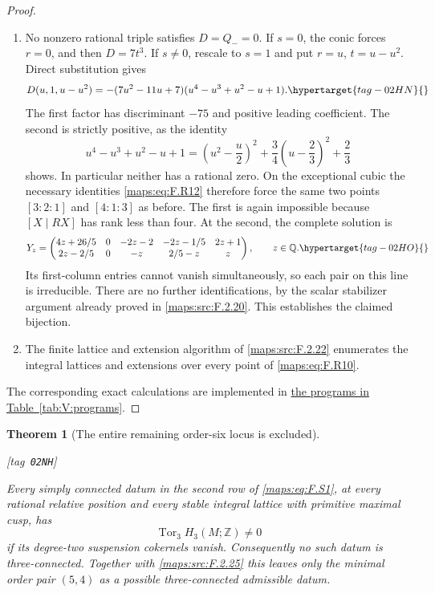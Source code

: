 \documentclass[11pt,a4paper]{article}
\numberwithin{equation}{section}
\newtheorem{theorem}{Theorem}[section]
\theoremstyle{definition}
\newcommand{\StatementRecord}[4]{{\upshape\footnotesize[tag~\texttt{#3}]}\enspace\ignorespaces}
\begin{document}
\begin{proof}
\begin{enumerate}[label=\arabic*.]
\item No nonzero rational triple satisfies $D=Q_-=0$.
If $s=0$, the conic forces $r=0$, and then $D=7t^3$.
If $s\ne0$, rescale to $s=1$ and put
$r=u$, $t=u-u^2$.  Direct substitution gives
\begin{equation}
 D(u,1,u-u^2)=
 -(7u^2-11u+7)(u^4-u^3+u^2-u+1).
 \hypertarget{tag-02HN}{}\label{maps:eq:F.R13}
\end{equation}
The first factor has discriminant $-75$ and positive
leading coefficient.  The second is strictly positive,
as the identity
\[
 u^4-u^3+u^2-u+1
 =\left(u^2-\frac u2\right)^2
  +\frac34\left(u-\frac23\right)^2+\frac23
\]
shows.  In particular neither has a rational zero.
On the exceptional cubic the necessary identities \eqref{maps:eq:F.R12}
therefore force the same two points $[3:2:1]$ and $[4:1:3]$
as before.  The first is again impossible because
$[X\mid RX]$ has rank less than four.
At the second, the complete solution is
\begin{equation}
 Y_z=\begin{pmatrix}
 4z+26/5&0&-2z-2&-2z-1/5&2z+1\\
 2z-2/5&0&-z&2/5-z&z
 \end{pmatrix},\qquad z\in\mathbb Q.
 \hypertarget{tag-02HO}{}\label{maps:eq:F.R14}
\end{equation}
Its first-column entries cannot vanish simultaneously,
so each pair on this line is irreducible.
There are no further identifications, by the scalar
stabilizer argument already proved in \ref{maps:src:F.2.20}.
This establishes the claimed bijection.

\item The finite lattice and extension algorithm of \ref{maps:src:F.2.22}
enumerates the integral lattices and extensions over every point of
\eqref{maps:eq:F.R10}.

\end{enumerate}
The corresponding exact calculations are implemented in \hyperlink{prog:V:normal-forms}{the programs in Table~\ref*{tab:V:programs}}.
\end{proof}




\begin{theorem}[The entire remaining order-six locus is excluded]\hypertarget{tag-02NH}{}\label{maps:src:F.2.27}
\StatementRecord{maps:src:F.2.27}{proved}{02NH}{\eqref{maps:eq:F.S1}, \cref{maps:src:F.2.25}, \eqref{maps:eq:F.S3}, \eqref{maps:eq:F.S5}, \eqref{maps:eq:F.X2}, \eqref{maps:eq:F.X3}, \eqref{maps:eq:F.S7}, \eqref{maps:eq:F.X5}}


Every simply connected datum in the second row of \eqref{maps:eq:F.S1},
at every rational relative position and every stable integral
lattice with primitive maximal cusp, has
\[
                 \operatorname{Tor}_3 H_3(M;\mathbb Z)\ne0
\]
if its degree-two suspension cokernels vanish.
Consequently no such datum is three-connected.  Together with
\ref{maps:src:F.2.25} this leaves only the minimal order pair $(5,4)$ as a possible three-connected admissible datum.
\end{theorem}
\end{document}
